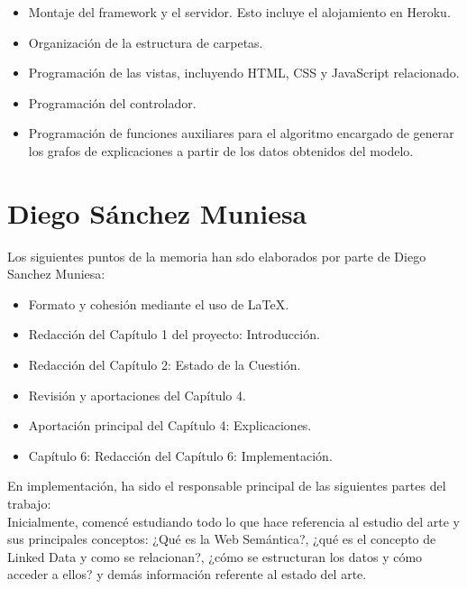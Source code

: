 \begin{itemize}
\item Montaje del framework y el servidor. Esto incluye el alojamiento en Heroku.

\item Organización de la estructura de carpetas.

\item Programación de las vistas, incluyendo HTML, CSS y JavaScript relacionado.

\item Programación del controlador.

\item Programación de funciones auxiliares para el algoritmo encargado de generar los grafos de explicaciones a partir de los datos obtenidos del modelo.

\end{itemize}


\section{Diego Sánchez Muniesa}

Los siguientes puntos de la memoria han sdo elaborados por parte de Diego Sanchez Muniesa:

\begin{itemize}
\item Formato y cohesión mediante el uso de LaTeX.

\item Redacción del Capítulo 1 del proyecto: Introducción.

\item Redacción del Capítulo 2: Estado de la Cuestión.

\item Revisión y aportaciones del Capítulo 4.

\item Aportación principal del Capítulo 4: Explicaciones.

\item Capítulo 6: Redacción del Capítulo 6: Implementación.\\

\end{itemize}

En implementación, ha sido el responsable principal de las siguientes partes del trabajo:\\

Inicialmente, comencé estudiando todo lo que hace referencia al estudio del arte y sus principales conceptos: ¿Qué es la Web Semántica?, ¿qué es el concepto de Linked Data y como se relacionan?, ¿cómo se estructuran los datos y cómo acceder a ellos? y demás información referente al estado del arte.\\

